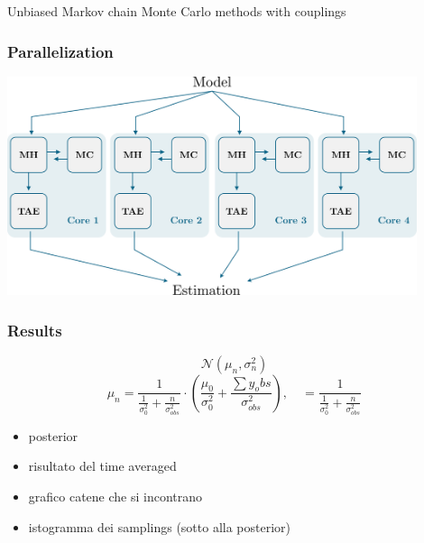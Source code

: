 \documentclass{beamer}
\begin{document}
\begin{section}{Unbiased Markov chain Monte Carlo methods with couplings}
	\begin{frame}
		\frametitle{Parallelization}
		\begin{center}
			\includegraphics[width=0.9\textwidth]{img/Bayes2}
		\end{center}
	\end{frame}


	\begin{frame}
		\frametitle{Results}
		
		$$\mathcal{N}(\mu_n, \sigma^2_n)$$
		$$
			\mu_n 
			= \frac{1}{ \frac{1}{\sigma_0^2} + \frac{n}{\sigma_{obs}^2} } 
			\cdot \left(\frac{\mu_0}{\sigma_0^2} + \frac{\sum y_obs}{\sigma_{obs}^2}\right)
			, \quad
			= \frac{1}{ \frac{1}{\sigma_0^2} + \frac{n}{\sigma_{obs}^2} } 
		$$


		\begin{itemize}
			\item posterior
			\item risultato del time averaged
			\item grafico catene che si incontrano
			\item istogramma dei samplings (sotto alla posterior)
		\end{itemize}
	\end{frame}
	
\end{section}
\end{document}

